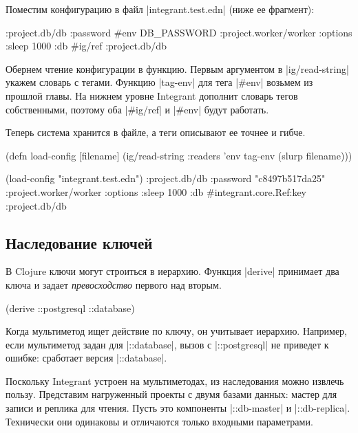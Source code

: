 Поместим конфигурацию в файл \spverb|integrant.test.edn| (ниже ее фрагмент):

\begin{english}
  \begin{clojure}
{:project.db/db {:password #env DB_PASSWORD}
 :project.worker/worker {:options {:sleep 1000}
                         :db #ig/ref :project.db/db}}
  \end{clojure}
\end{english}

Обернем чтение конфигурации в функцию. Первым аргументом в
\spverb|ig/read-string| укажем словарь с тегами. Функцию \spverb|tag-env| для
тега \spverb|#env| возьмем из прошлой главы. На нижнем уровне Integrant
дополнит словарь тегов собственными, поэтому оба \spverb|#ig/ref| и
\spverb|#env| будут работать.

Теперь система хранится в файле, а теги описывают ее точнее и гибче.

\begin{english}
  \begin{clojure}
(defn load-config [filename]
  (ig/read-string {:readers {'env tag-env}}
                  (slurp filename)))

(load-config "integrant.test.edn")
{:project.db/db {:password "c8497b517da25"}
 :project.worker/worker
 {:options {:sleep 1000}
  :db #integrant.core.Ref{:key :project.db/db}}}
  \end{clojure}
\end{english}

\subsection{Наследование ключей}

В Clojure ключи могут строиться в иерархию. Функция \spverb|derive| принимает
два ключа и задает \emph{превосходство} первого над вторым.

\begin{english}
  \begin{clojure}
(derive ::postgresql ::database)
  \end{clojure}
\end{english}

Когда мультиметод ищет действие по ключу, он учитывает иерархию. Например, если
мультиметод задан для \spverb|::database|, вызов с \spverb|::postgresql| не
приведет к ошибке: сработает версия \spverb|::database|.

Поскольку Integrant устроен на мультиметодах, из наследования можно
извлечь пользу. Представим нагруженный проекты с двумя базами данных: мастер для
записи и реплика для чтения. Пусть это компоненты \spverb|::db-master| и
\spverb|::db-replica|. Технически они одинаковы и отличаются только входными
параметрами.

